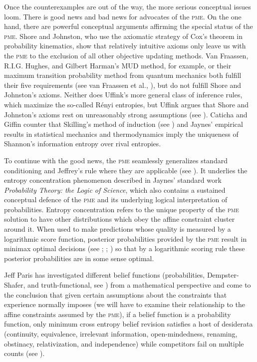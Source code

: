 \documentclass[11pt]{article}
\begin{document}
Once the counterexamples are out of the way, the more serious
conceptual issues loom. There is good news and bad news for advocates
of the \textsc{pme}. On the one hand, there are powerful conceptual
arguments affirming the special status of the \textsc{pme}. Shore and
Johnston, who use the axiomatic strategy of Cox's theorem in
probability kinematics, show that relatively intuitive axioms only
leave us with the \textsc{pme} to the exclusion of all other objective
updating methods. Van Fraassen, R.I.G. Hughes, and Gilbert Harman's
MUD method, for example, or their maximum transition probability
method from quantum mechanics both fulfill their five requirements
(see van Fraassen et al., ), but do not
fulfill Shore and Johnston's axioms. Neither does Uffink's more
general class of inference rules, which maximize the so-called
R{\'e}nyi entropies, but Uffink argues that Shore and Johnston's
axioms rest on unreasonably strong assumptions (see
). Caticha and Giffin counter that Skilling's
method of induction (see ) and Jaynes'
empirical results in statistical mechanics and thermodynamics imply
the uniqueness of Shannon's information entropy over rival entropies.

To continue with the good news, the \textsc{pme} seamlessly
generalizes standard conditioning and Jeffrey's rule where they are
applicable (see ). It underlies the
entropy concentration phenomenon described in Jaynes' standard work
\emph{Probability Theory: the Logic of Science}, which also contains a
sustained conceptual defence of the \textsc{pme} and its underlying
logical interpretation of probabilities. Entropy concentration refers
to the unique property of the \textsc{pme} solution to have other
distributions which obey the affine constraint cluster around it. When
used to make predictions whose quality is measured by a logarithmic
score function, posterior probabilities provided by the \textsc{pme}
result in minimax optimal decisions (see ;
; ) so that by a
logarithmic scoring rule these posterior probabilities are in some
sense optimal.

Jeff Paris has investigated different belief functions (probabilities,
Dempster-Shafer, and truth-functional, see ) from
a mathematical perspective and come to the conclusion that given
certain assumptions about the constraints that experience normally
imposes (we will have to examine their relationship to the affine
constraints assumed by the \textsc{pme}), if a belief function is a
probability function, only minimum cross entropy belief revision
satisfies a host of desiderata (continuity, equivalence, irrelevant
information, open-mindedness, renaming, obstinacy, relativization, and
independence) while competitors fail on multiple counts (see
).
\end{document}
